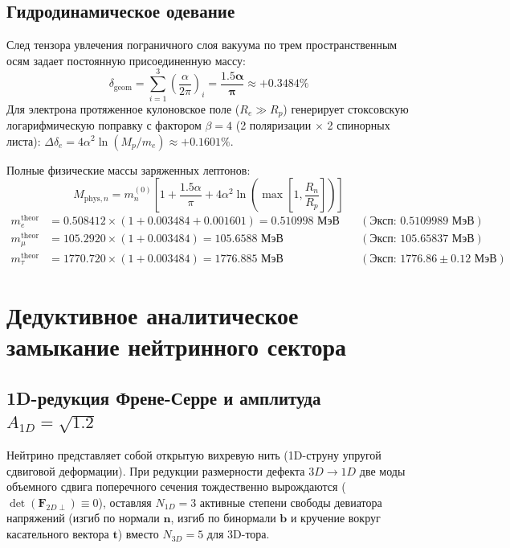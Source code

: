 \documentclass[12pt,a4paper]{article}
\begin{document}
	\subsection{Гидродинамическое одевание}
	След тензора увлечения пограничного слоя вакуума по трем пространственным осям задает постоянную присоединенную массу:
	\begin{equation}
		\delta_{\text{geom}} = \sum_{i=1}^3 \left(\frac{\alpha}{2\pi}\right)_i = \mathbf{\frac{1.5\alpha}{\pi}} \approx \mathbf{+0.3484\%}
	\end{equation}
	Для электрона протяженное кулоновское поле ($R_e \gg R_p$) генерирует стоксовскую логарифмическую поправку с фактором $\beta = 4$ (2 поляризации $\times$ 2 спинорных листа): $\Delta \delta_e = 4\alpha^2 \ln(M_p/m_e) \approx \mathbf{+0.1601\%}$.
	
	Полные физические массы заряженных лептонов:
	\begin{equation}
		M_{\text{phys}, n} = m_n^{(0)} \left[ 1 + \frac{1.5\alpha}{\pi} + 4\alpha^2 \ln\left(\max\left[1, \frac{R_n}{R_p}\right]\right) \right]
	\end{equation}
	\begin{align}
		m_e^{\text{theor}} &= 0.508412 \times (1 + 0.003484 + 0.001601) = \mathbf{0.510998 \text{ МэВ}} \quad &(\text{Эксп: } 0.5109989 \text{ МэВ}) \\
		m_\mu^{\text{theor}} &= 105.2920 \times (1 + 0.003484) = \mathbf{105.6588 \text{ МэВ}} \quad &(\text{Эксп: } 105.65837 \text{ МэВ}) \\
		m_\tau^{\text{theor}} &= 1770.720 \times (1 + 0.003484) = \mathbf{1776.885 \text{ МэВ}} \quad &(\text{Эксп: } 1776.86 \pm 0.12 \text{ МэВ})
	\end{align}
	
\section{Дедуктивное аналитическое замыкание нейтринного сектора}

\subsection{1D-редукция Френе-Серре и амплитуда $A_{1D} = \sqrt{1.2}$}
Нейтрино представляет собой открытую вихревую нить (1D-струну упругой сдвиговой деформации). При редукции размерности дефекта $3D \to 1D$ две моды объемного сдвига поперечного сечения тождественно вырождаются ($\det(\mathbf{F}_{2D \perp}) \equiv 0$), оставляя $N_{1D} = 3$ активные степени свободы девиатора напряжений (изгиб по нормали $\mathbf{n}$, изгиб по бинормали $\mathbf{b}$ и кручение вокруг касательного вектора $\mathbf{t}$) вместо $N_{3D} = 5$ для 3D-тора.
\end{document}
